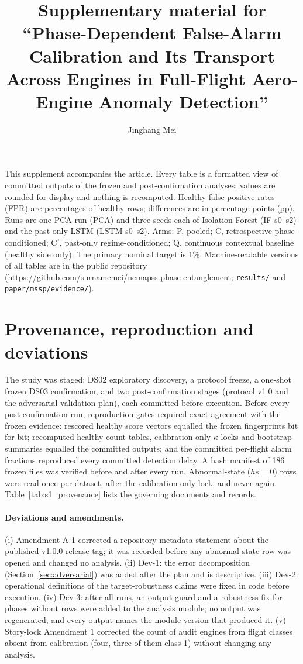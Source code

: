 \documentclass[11pt]{article}
\title{Supplementary material for\\``Phase-Dependent False-Alarm Calibration and Its Transport Across Engines in Full-Flight Aero-Engine Anomaly Detection''}
\author{Jinghang Mei}
\date{}
\begin{document}
\maketitle

\noindent This supplement accompanies the article. Every table is a formatted view of committed outputs of the frozen
and post-confirmation analyses; values are rounded for display and nothing is recomputed. Healthy false-positive rates
(FPR) are percentages of healthy rows; differences are in percentage points (pp). Runs are one PCA run (PCA) and three
seeds each of Isolation Forest (IF s0--s2) and the past-only LSTM (LSTM s0--s2). Arms: P, pooled; C, retrospective
phase-conditioned; C$'$, past-only regime-conditioned; Q, continuous contextual baseline (healthy side only). The primary
nominal target is 1\%. Machine-readable versions of all tables are in the public repository
(\url{https://github.com/surnamemei/ncmapss-phase-entanglement}; \texttt{results/} and \texttt{paper/mssp/evidence/}).

\tableofcontents
\bigskip

\section{Provenance, reproduction and deviations}
The study was staged: DS02 exploratory discovery, a protocol freeze, a one-shot frozen DS03 confirmation, and two
post-confirmation stages (protocol v1.0 and the adversarial-validation plan), each committed before execution.
Before every post-confirmation run, reproduction gates required exact agreement with the frozen evidence:
rescored healthy score vectors equalled the frozen fingerprints bit for bit; recomputed healthy count tables,
calibration-only $\kappa$ locks and bootstrap summaries equalled the committed outputs; and the committed per-flight
alarm fractions reproduced every committed detection delay. A hash manifest of 186 frozen files was verified before
and after every run. Abnormal-state ($hs = 0$) rows were read once per dataset, after the calibration-only lock, and
never again. Table~\ref{tab:s1_provenance} lists the governing documents and records.

\paragraph{Deviations and amendments.}
(i) Amendment A-1 corrected a repository-metadata statement about the published v1.0.0 release tag; it was recorded
before any abnormal-state row was opened and changed no analysis. (ii) Dev-1: the error decomposition (Section~\ref{sec:adversarial}) was added after the plan and is
descriptive. (iii) Dev-2: operational definitions of the target-robustness claims were fixed in code before execution.
(iv) Dev-3: after all runs, an output guard and a robustness fix for phases without rows were added to the analysis
module; no output was regenerated, and every output names the module version that produced it. (v) Story-lock
Amendment 1 corrected the count of audit engines from flight classes absent from calibration (four, three of them
class 1) without changing any analysis.
\end{document}
